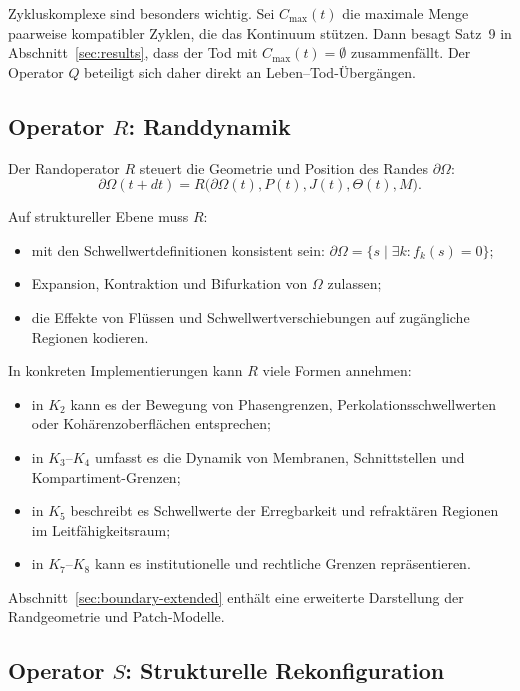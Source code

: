 Zykluskomplexe sind besonders wichtig. Sei \(C_{\max}(t)\) die maximale Menge
paarweise kompatibler Zyklen, die das Kontinuum stützen. Dann besagt Satz~9 in
Abschnitt~\ref{sec:results}, dass der Tod mit \(C_{\max}(t) = \emptyset\)
zusammenfällt. Der Operator \(Q\) beteiligt sich daher direkt an
Leben--Tod-Übergängen.

\subsection{Operator \texorpdfstring{\texorpdfstring{$R$}{R}}{R}: Randdynamik}

Der Randoperator \(R\) steuert die Geometrie und Position des Randes
\(\partial\Omega\):
\[
  \partial\Omega(t+dt) =
    R\big(\partial\Omega(t), P(t), J(t), \Theta(t), M\big).
\]

Auf struktureller Ebene muss \(R\):
\begin{itemize}
  \item mit den Schwellwertdefinitionen konsistent sein:
        \(\partial\Omega = \{ s \mid \exists k: f_k(s) = 0 \}\);
  \item Expansion, Kontraktion und Bifurkation von \(\Omega\) zulassen;
  \item die Effekte von Flüssen und Schwellwertverschiebungen auf
        zugängliche Regionen kodieren.
\end{itemize}

In konkreten Implementierungen kann \(R\) viele Formen annehmen:
\begin{itemize}
  \item in \(K_2\) kann es der Bewegung von Phasengrenzen,
        Perkolationsschwellwerten oder Kohärenzoberflächen entsprechen;
  \item in \(K_3\)–\(K_4\) umfasst es die Dynamik von Membranen,
        Schnittstellen und Kompartiment-Grenzen;
  \item in \(K_5\) beschreibt es Schwellwerte der Erregbarkeit und
        refraktären Regionen im Leitfähigkeitsraum;
  \item in \(K_7\)–\(K_8\) kann es institutionelle und rechtliche
        Grenzen repräsentieren.
\end{itemize}

Abschnitt~\ref{sec:boundary-extended} enthält eine erweiterte Darstellung der
Randgeometrie und Patch-Modelle.

\subsection{Operator \texorpdfstring{\texorpdfstring{$S$}{S}}{S}: Strukturelle
Rekonfiguration}

